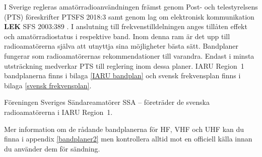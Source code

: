 I Sverige regleras amatörradioanvändningen främst genom Post- och
telestyrelsens (PTS) föreskrifter PTSFS 2018:3 \cite{PTSFS2018:3} samt genom lag
om elektronisk kommunikation \textbf{LEK} SFS 2003:389 \cite{SFS2003:389}.
I anslutning till frekvenstilldelningen anges tillåten effekt och
amatörradiostatus i respektive band.
Inom denna ram är det upp till radioamatörerna själva att utnyttja sina
möjligheter bästa sätt.
Bandplaner fungerar som radioamatörernas rekommendationer till varandra.
Endast i minsta utsträckning medverkar PTS till reglering inom dessa planer.
IARU Region~1 bandplanerna finns i bilaga \ref{IARU bandplan} och svensk
frekvensplan finns i bilaga \ref{svensk frekvensplan}.

\newpage %
Föreningen Sveriges Sändareamatörer SSA -- företräder de svenska
radioamatörerna i IARU Region~1.

Mer information om de rådande bandplanerna för HF, VHF och UHF kan du finna i appendix \ref{bandplaner2} men kontrollera alltid mot en officiell källa innan du använder dem för sändning.
